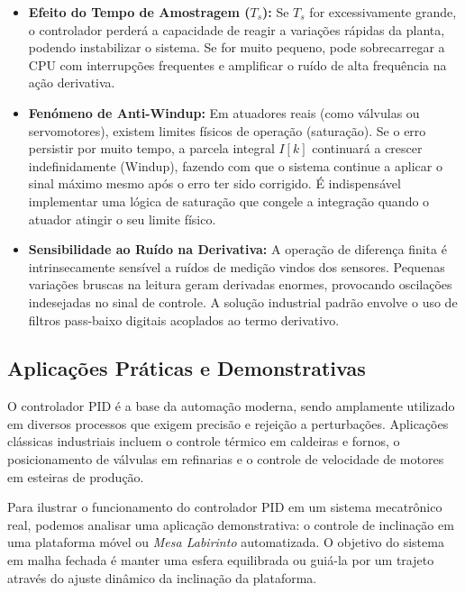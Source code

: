\documentclass[12pt]{article}
\begin{document}
\begin{itemize}
    \item \textbf{Efeito do Tempo de Amostragem ($T_s$):} Se $T_s$ for excessivamente grande, o controlador perderá a capacidade de reagir a variações rápidas da planta, podendo instabilizar o sistema. Se for muito pequeno, pode sobrecarregar a CPU com interrupções frequentes e amplificar o ruído de alta frequência na ação derivativa.
    \item \textbf{Fenómeno de Anti-Windup:} Em atuadores reais (como válvulas ou servomotores), existem limites físicos de operação (saturação). Se o erro persistir por muito tempo, a parcela integral $I[k]$ continuará a crescer indefinidamente (Windup), fazendo com que o sistema continue a aplicar o sinal máximo mesmo após o erro ter sido corrigido. É indispensável implementar uma lógica de saturação que congele a integração quando o atuador atingir o seu limite físico.
    \item \textbf{Sensibilidade ao Ruído na Derivativa:} A operação de diferença finita é intrinsecamente sensível a ruídos de medição vindos dos sensores. Pequenas variações bruscas na leitura geram derivadas enormes, provocando oscilações indesejadas no sinal de controle. A solução industrial padrão envolve o uso de filtros pass-baixo digitais acoplados ao termo derivativo.
\end{itemize}

\subsection{Aplicações Práticas e Demonstrativas}

O controlador PID é a base da automação moderna, sendo amplamente utilizado em diversos processos que exigem precisão e rejeição a perturbações. Aplicações clássicas industriais incluem o controle térmico em caldeiras e fornos, o posicionamento de válvulas em refinarias e o controle de velocidade de motores em esteiras de produção.

Para ilustrar o funcionamento do controlador PID em um sistema mecatrônico real, podemos analisar uma aplicação demonstrativa: o controle de inclinação em uma plataforma móvel ou \textit{Mesa Labirinto} automatizada. O objetivo do sistema em malha fechada é manter uma esfera equilibrada ou guiá-la por um trajeto através do ajuste dinâmico da inclinação da plataforma.
\end{document}
